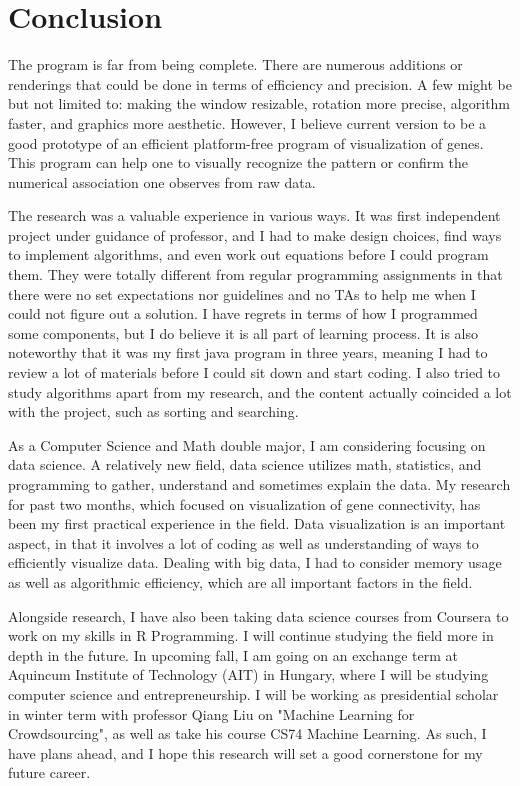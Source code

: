 \documentclass[]{article}
\begin{document}
\section{Conclusion}

The program is far from being complete. There are numerous additions or renderings that could be done in terms of efficiency and precision. A few might be but not limited to: making the window resizable, rotation more precise, algorithm faster, and graphics more aesthetic. However, I believe current version to be a good prototype of an efficient platform-free program of visualization of genes. This program can help one to visually recognize the pattern or confirm the numerical association one observes from raw data. 

The research was a valuable experience in various ways. It was first independent project under guidance of professor, and I had to make design choices, find ways to implement algorithms, and even work out equations before I could program them. They were totally different from regular programming assignments in that there were no set expectations nor guidelines and no TAs to help me when I could not figure out a solution. I have regrets in terms of how I programmed some components, but I do believe it is all part of learning process. It is also noteworthy that it was my first java program in three years, meaning I had to review a lot of materials before I could sit down and start coding. I also tried to study algorithms apart from my research, and the content actually coincided a lot with the project, such as sorting and searching.

As a Computer Science and Math double major, I am considering focusing on data science. A relatively new field, data science utilizes math, statistics, and programming to gather, understand and sometimes explain the data. My research for past two months, which focused on visualization of gene connectivity, has been my first practical experience in the field. Data visualization is an important aspect, in that it involves a lot of coding as well as understanding of ways to efficiently visualize data. Dealing with big data, I had to consider memory usage as well as algorithmic efficiency, which are all important factors in the field.

Alongside research, I have also been taking data science courses from Coursera to work on my skills in R Programming. I will continue studying the field more in depth in the future. In upcoming fall, I am going on an exchange term at Aquincum Institute of Technology (AIT) in Hungary, where I will be studying computer science and entrepreneurship. I will be working as presidential scholar in winter term with professor Qiang Liu on "Machine Learning for Crowdsourcing", as well as take his course CS74 Machine Learning. As such, I have plans ahead, and I hope this research will set a good cornerstone for my future career. 
\end{document}
